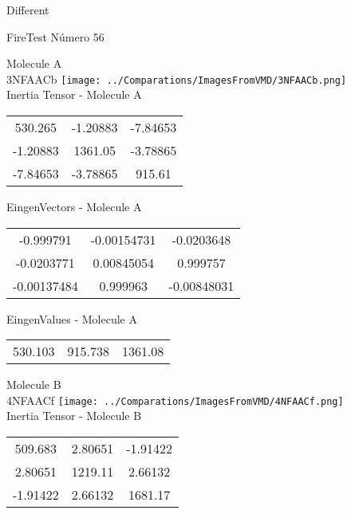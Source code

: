 \begin{center}
\vtab
\vtab
\textcolor{NavyBlue}{\Large Different}
\end{center}

 \newpage

\vtab[-2cm]
\begin{center}
{\large FireTest \tab Número 56}
\end{center}
\begin{multicols}{2}
\begin{center}

Molecule A \\ 
3NFAACb
\texttt{[image: ../Comparations/ImagesFromVMD/3NFAACb.png]}
\\
Inertia Tensor - Molecule A \\
\vtab

\begin{tabular}{|c c c|}
530.265	 & 	-1.20883	 & 	-7.84653	 \\
-1.20883	 & 	1361.05	 & 	-3.78865	 \\
-7.84653	 & 	-3.78865	 & 	915.61
\end{tabular}

\vtab
 EingenVectors - Molecule A     \\
\vtab
\begin{tabular}{|c c c|}
-0.999791	 & 	-0.00154731	 & 	-0.0203648	 \\
-0.0203771	 & 	0.00845054	 & 	0.999757	 \\
-0.00137484	 & 	0.999963	 & 	-0.00848031
\end{tabular}

\vtab
 EingenValues - Molecule A     \\
\vtab
\begin{tabular}{|c c c|}
530.103	 & 	915.738	 & 	1361.08	 \\
\end{tabular}
\columnbreak

Molecule B \\ 
4NFAACf
\texttt{[image: ../Comparations/ImagesFromVMD/4NFAACf.png]}
\\
Inertia Tensor - Molecule B \\
\vtab

\begin{tabular}{|c c c|}
509.683	 & 	2.80651	 & 	-1.91422	 \\
2.80651	 & 	1219.11	 & 	2.66132	 \\
-1.91422	 & 	2.66132	 & 	1681.17
\end{tabular}


\end{center}
\end{multicols}
